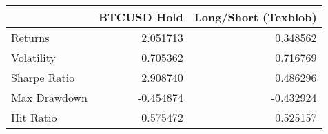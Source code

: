 \begin{tabular}{lrr}
\toprule
{} &  BTCUSD Hold &  Long/Short (Texblob) \\
\midrule
Returns      &     2.051713 &              0.348562 \\
Volatility   &     0.705362 &              0.716769 \\
Sharpe Ratio &     2.908740 &              0.486296 \\
Max Drawdown &    -0.454874 &             -0.432924 \\
Hit Ratio    &     0.575472 &              0.525157 \\
\bottomrule
\end{tabular}
